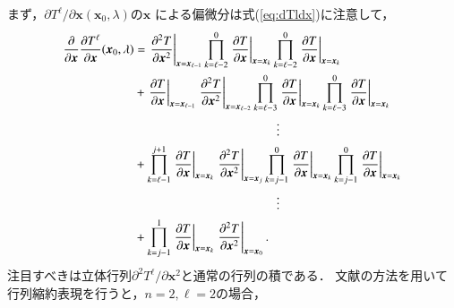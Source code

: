 \documentclass[a4paper,dvipdfmx]{jsarticle}
\newcommand{\pdiff}[3]{
 \ifnum #1<1
 \text{Args[0] should be more than 1} \else{
 \ifnum #1=1 \displaystyle \frac{\partial #2}{\partial #3}\else
 \displaystyle \frac{\partial^{#1} #2}{\partial #3^{#1}}\fi
 }\fi
}
\begin{document}
まず，$\partial T^\ell/\partial \bm{x}(\bm{x}_0, \lambda)$の$\bm{x}$
による偏微分は式(\ref{eq:dTldx})に注意して，
\begin{align}
\begin{split}    
    \pdiff{1}{}{\bm{x}}\pdiff{1}{T^\ell}{\bm{x}}(\bm{x}_0, \lambda) &=
    \left.\pdiff{1}{{}^2T}{\bm{x}^2}\right|_{\bm{x}=\bm{x}_{\ell-1}}
    \prod_{k=\ell-2}^0\left.\pdiff{1}{T}{\bm{x}}\right|_{\bm{x}=\bm{x}_k}
    \prod_{k=\ell-2}^0\left.\pdiff{1}{T}{\bm{x}}\right|_{\bm{x}=\bm{x}_k}\\
    &+ \left.\pdiff{1}{T}{\bm{x}}\right|_{\bm{x}=\bm{x}_{\ell-1}}
    \left.\pdiff{1}{{}^2T}{\bm{x}^2}\right|_{\bm{x}=\bm{x}_{\ell-2}}
    \prod_{k=\ell-3}^0\left.\pdiff{1}{T}{\bm{x}}\right|_{\bm{x}=\bm{x}_k}
    \prod_{k=\ell-3}^0\left.\pdiff{1}{T}{\bm{x}}\right|_{\bm{x}=\bm{x}_k}\\
    &{}\hspace{4cm}\vdots \\
    &+ \prod_{k=\ell-1}^{j+1}\left.\pdiff{1}{T}{\bm{x}}\right|_{\bm{x}=\bm{x}_k}
    \left.\pdiff{1}{{}^2T}{\bm{x}^2}\right|_{\bm{x}=\bm{x}_{j}}
    \prod_{k=j-1}^0\left.\pdiff{1}{T}{\bm{x}}\right|_{\bm{x}=\bm{x}_k}
    \prod_{k=j-1}^0\left.\pdiff{1}{T}{\bm{x}}\right|_{\bm{x}=\bm{x}_k}\\
    &{}\hspace{4cm}\vdots \\
    &+ \prod_{k=j-1}^1\left.\pdiff{1}{T}{\bm{x}}\right|_{\bm{x}=\bm{x}_k}
    \left.\pdiff{1}{{}^2T}{\bm{x}^2}\right|_{\bm{x}=\bm{x}_0}.
\end{split}
\end{align}
注目すべきは立体行列$\partial^2 T^\ell/\partial \bm{x}^2$と通常の行列の積である．
文献\cite{multidim}の方法を用いて行列縮約表現を行うと，$n=2, \ell=2$の場合，
\end{document}
